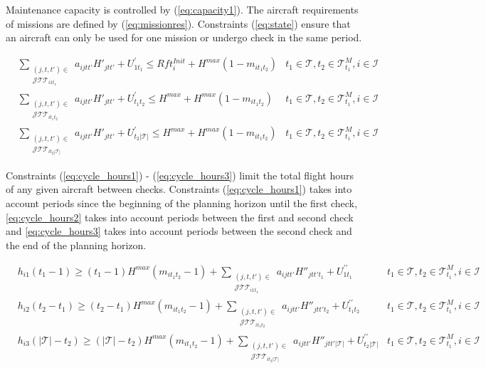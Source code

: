 \documentclass[a4paper,onecolumn,fleqn]{article}
\begin{document}
    Maintenance capacity is controlled by (\ref{eq:capacity1}). The aircraft requirements of missions are defined by (\ref{eq:missionres}). Constraints (\ref{eq:state}) ensure that an aircraft can only be used for one mission or undergo check in the same period.

    \begin{align}
        & \sum_{\substack{(j, t, t') \in \\ \mathcal{J}\mathcal{T}\mathcal{T}_{i1t_1}}} a_{ijtt'} H'_{jtt'} + U^{\prime}_{1t_1} \leq Rft^{Init}_i + H^{max} (1 - m_{it_1t_2}) 
                & t_1 \in \mathcal{T}, t_2 \in \mathcal{T}^M_{t_1}, i \in \mathcal{I}\label{eq:cycle_hours1}\\
        & \sum_{\substack{(j, t, t') \in \\ \mathcal{J}\mathcal{T}\mathcal{T}_{it_1t_2}}} a_{ijtt'} H'_{jtt'} + U^{\prime}_{t_1t_2} \leq H^{max} + H^{max} (1 - m_{it_1t_2}) 
                & t_1 \in \mathcal{T}, t_2 \in \mathcal{T}^M_{t_1}, i \in \mathcal{I}\label{eq:cycle_hours2}\\
        & \sum_{\substack{(j, t, t') \in \\ \mathcal{J}\mathcal{T}\mathcal{T}_{it_2|\mathcal{T}|}}} a_{ijtt'} H'_{jtt'} + U^{\prime}_{t_2|\mathcal{T}|} \leq H^{max} + H^{max} (1 - m_{it_1t_2}) 
                & t_1 \in \mathcal{T}, t_2 \in \mathcal{T}^M_{t_1}, i \in \mathcal{I}\label{eq:cycle_hours3}
    \end{align}

        Constraints (\ref{eq:cycle_hours1}) - (\ref{eq:cycle_hours3}) limit the total flight hours of any given aircraft between checks. Constraints (\ref{eq:cycle_hours1}) takes into account periods since the beginning of the planning horizon until the first check, \ref{eq:cycle_hours2} takes into account periods between the first and second check and \ref{eq:cycle_hours3} takes into account periods between the second check and the end of the planning horizon.

    \begin{align}
        & h_{i1} (t_1 - 1) \geq (t_1 - 1) H^{max} (m_{it_1t_2} -1) + \sum_{\substack{(j, t, t') \in \\ \mathcal{J}\mathcal{T}\mathcal{T}_{i1t_1}}} a_{ijtt'} H''_{jtt't_1} + U^{\prime\prime}_{1t_1} 
            & t_1 \in \mathcal{T}, t_2 \in \mathcal{T}^M_{t_1}, i \in \mathcal{I}\label{eq:cycle_rem_hours1}\\
        & h_{i2} (t_2 - t_1) \geq (t_2 - t_1) H^{max} (m_{it_1t_2} -1) + \sum_{\substack{(j, t, t') \in \\ \mathcal{J}\mathcal{T}\mathcal{T}_{it_1t_2}}} a_{ijtt'} H''_{jtt't_2} + U^{\prime\prime}_{t_1t_2}
            &t_1 \in \mathcal{T}, t_2 \in \mathcal{T}^M_{t_1}, i \in \mathcal{I}\label{eq:cycle_rem_hours2}\\
        & h_{i3} (|\mathcal{T}|- t_2) \geq (|\mathcal{T}|- t_2) H^{max} (m_{it_1t_2} -1) + \sum_{\substack{(j, t, t') \in \\ \mathcal{J}\mathcal{T}\mathcal{T}_{it_2|\mathcal{T}|}}} a_{ijtt'} H''_{jtt'|\mathcal{T}|} + U^{\prime\prime}_{t_2|\mathcal{T}|}
            & t_1 \in \mathcal{T}, t_2 \in \mathcal{T}^M_{t_1}, i \in \mathcal{I}\label{eq:cycle_rem_hours3}
    \end{align}
\end{document}
